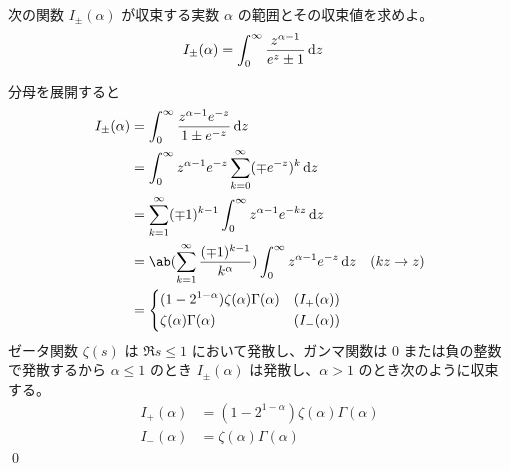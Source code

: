 \documentclass[uplatex,dvipdfmx,a4paper,11pt]{jlreq}
\makeatletter
\numberwithin{equation}{section}
\theoremstyle{definition}
\renewenvironment{proof}[1][\proofname]{\par
  \normalfont
  \topsep6\p@\@plus6\p@ \trivlist
  \item[\hskip\labelsep{\bfseries #1}\@addpunct{\bfseries}]\ignorespaces\quad\par
}{%
  \qed\endtrivlist\@endpefalse
}
\renewcommand\proofname{証明}
\makeatother
\begin{document}
\begin{problem}
次の関数 $I_\pm(\alpha)$ が収束する実数 $\alpha$ の範囲とその収束値を求めよ。
\begin{align}
  I_\pm(\alpha) & = \int_0^\infty\frac{z^{\alpha - 1}}{e^z \pm 1}\dl{z}
\end{align}
\end{problem}
\begin{proof}
  分母を展開すると
  \begin{align}
    I_\pm(\alpha) & = \int_0^\infty\frac{z^{\alpha - 1}e^{-z}}{1 \pm e^{-z}}\dl{z}                                                \\
                  & = \int_0^\infty z^{\alpha - 1}e^{-z}\sum_{k=0}^{\infty}(\mp e^{-z})^k\dl{z}                                   \\
                  & = \sum_{k=1}^{\infty}(\mp 1)^{k-1}\int_0^\infty z^{\alpha - 1}e^{-kz}\dl{z}                                   \\
                  & = \ab(\sum_{k=1}^{\infty}\frac{(\mp 1)^{k-1}}{k^\alpha})\int_0^\infty z^{\alpha - 1}e^{-z}\dl{z} & (kz \to z) \\
                  & = \begin{dcases}
                        (1 - 2^{1 - \alpha})\zeta(\alpha)\Gamma(\alpha) & (I_+(\alpha)) \\
                        \zeta(\alpha)\Gamma(\alpha)                     & (I_-(\alpha)) \\
                      \end{dcases}
  \end{align}
  ゼータ関数 $\zeta(s)$ は $\Re s \leq 1$ において発散し、ガンマ関数は $0$ または負の整数で発散するから $\alpha \leq 1$ のとき $I_{\pm}(\alpha)$ は発散し、$\alpha > 1$ のとき次のように収束する。
  \begin{align}
    I_+(\alpha) & = (1 - 2^{1 - \alpha})\zeta(\alpha)\Gamma(\alpha) \\
    I_-(\alpha) & = \zeta(\alpha)\Gamma(\alpha)
  \end{align}
\end{proof}

\setcounter{subsection}{5}
\end{document}
